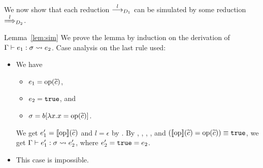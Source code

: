 We now show that each reduction \(\stackrel{l}{\longrightarrow}_{D_1}\) can be simulated by
some reduction \(\stackrel{l}{\Longrightarrow}_{D_2}\).
\begin{pfof}{Lemma~\ref{lem:sim}}
We prove the lemma by induction on the derivation of
\(\Gamma \vdash e_1 : \sigma \leadsto e_2\).
Case analysis on the last rule used:
\begin{itemize}
\item[] 
We have
\begin{itemize}
\item \(e_1=\mathrm{op}(\widetilde{c})\),
\item \(e_2=\mathtt{true}\), and
\item \(\sigma=b[\lambda x.x=\mathrm{op}(\widetilde{c})]\).
\end{itemize}
We get \(e_1'=[\![\mathrm{op}]\!](\widetilde{c})\) and \(l=\epsilon\) by .
By , , , , and \(([\![\mathrm{op}]\!](\widetilde{c})=\mathrm{op}(\widetilde{c})) \equiv \mathtt{true}\), we get
\(\Gamma \vdash e_1' : \sigma \leadsto e_2'\), where
\(e_2'=\mathtt{true}=e_2\).


\item[]  This case is impossible.


\end{itemize}
\end{pfof}
